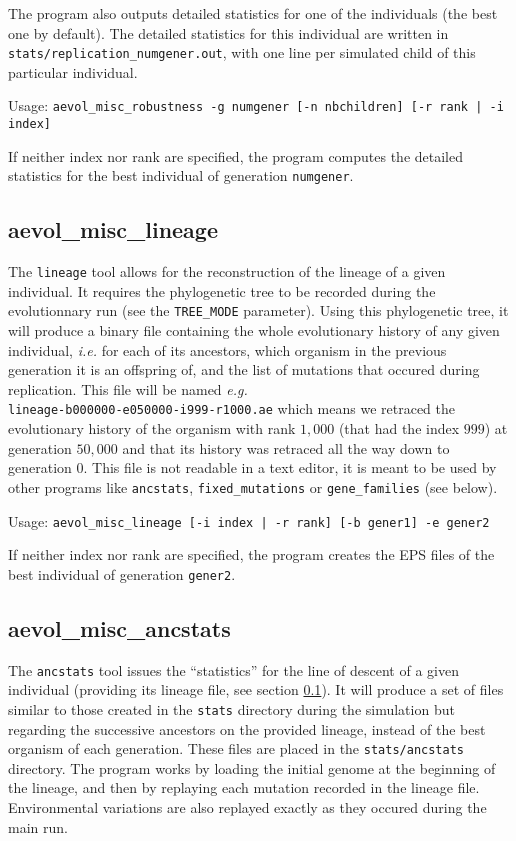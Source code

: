 The program also outputs detailed statistics for one of the individuals (the best one by default). The detailed statistics for this individual are written in \verb?stats/replication_numgener.out?, with one line per simulated child of this particular individual.

Usage: \verb?aevol_misc_robustness -g numgener [-n nbchildren] [-r rank | -i index]?

If neither index nor rank are specified, the program computes the detailed statistics for the best individual of generation \verb?numgener?.


\subsection{aevol\_misc\_lineage}
\label{sect:lineage}
The \verb?lineage? tool allows for the reconstruction of the lineage of a given individual. It requires the phylogenetic tree to be recorded during the evolutionnary run (see the \verb?TREE_MODE? parameter). Using this phylogenetic tree, it will produce a binary file containing the whole evolutionary history of any given individual, \emph{i.e.} for each of its ancestors, which organism in the previous generation it is an offspring of, and the list of mutations that occured during replication. This file will be named \emph{e.g.} \\\verb?lineage-b000000-e050000-i999-r1000.ae? which means we retraced the evolutionary history of the organism with rank $1,000$ (that had the index $999$) at generation $50,000$ and that its history was retraced all the way down to generation $0$. This file is not readable in a text editor, it is meant to be used by other programs like \verb?ancstats?, \verb?fixed_mutations? or \verb?gene_families? (see below).

Usage: \verb?aevol_misc_lineage [-i index | -r rank] [-b gener1] -e gener2?

If neither index nor rank are specified, the program creates the EPS files of the best individual of generation \verb?gener2?.


\subsection{aevol\_misc\_ancstats}
\label{sect:ancstats}
The \verb?ancstats? tool issues the ``statistics'' for the line of descent of a given individual (providing its lineage file, see section \ref{sect:lineage}). It will produce a set of files similar to those created in the \verb?stats? directory during the simulation but regarding the successive ancestors on the provided lineage, instead of the best organism of each generation. These files are placed in the \verb?stats/ancstats? directory. The program works by loading the initial genome at the beginning of the lineage, and then by replaying each mutation recorded in the lineage file. Environmental variations are also replayed exactly as they occured during the main run.

